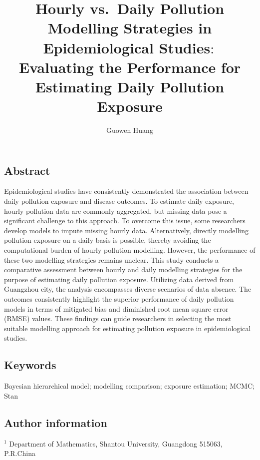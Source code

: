 \documentclass[
  12,
]{article}
\title{Hourly vs.~Daily Pollution Modelling Strategies in
Epidemiological Studies\(:\) Evaluating the Performance for Estimating
Daily Pollution Exposure}
\author{Guowen Huang}
\date{}
\begin{document}
\maketitle

\hypertarget{abstract}{%
\subsection*{Abstract}\label{abstract}}

\linenumbers

Epidemiological studies have consistently demonstrated the association
between daily pollution exposure and disease outcomes. To estimate daily
exposure, hourly pollution data are commonly aggregated, but missing
data pose a significant challenge to this approach. To overcome this
issue, some researchers develop models to impute missing hourly data.
Alternatively, directly modelling pollution exposure on a daily basis is
possible, thereby avoiding the computational burden of hourly pollution
modelling. However, the performance of these two modelling strategies
remains unclear. This study conducts a comparative assessment between
hourly and daily modelling strategies for the purpose of estimating
daily pollution exposure. Utilizing data derived from Guangzhou city,
the analysis encompasses diverse scenarios of data absence. The outcomes
consistently highlight the superior performance of daily pollution
models in terms of mitigated bias and diminished root mean square error
(RMSE) values. These findings can guide researchers in selecting the
most suitable modelling approach for estimating pollution exposure in
epidemiological studies.

\hypertarget{keywords}{%
\subsection*{Keywords}\label{keywords}}

Bayesian hierarchical model; modelling comparison; exposure estimation;
MCMC; Stan

\hypertarget{author-information}{%
\subsection*{Author information}\label{author-information}}

\(^1\) Department of Mathematics, Shantou University, Guangdong 515063,
P.R.China
\end{document}

